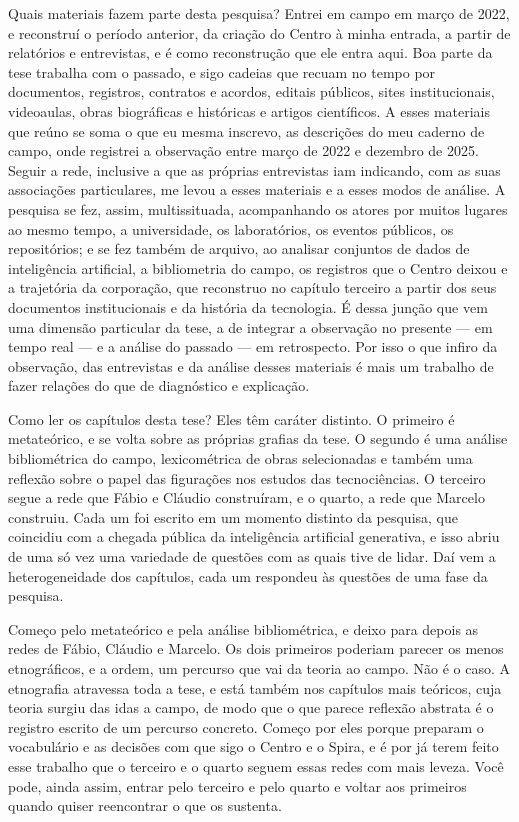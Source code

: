 Quais materiais fazem parte desta pesquisa? Entrei em campo em março de 2022, e reconstruí o período anterior, da criação do Centro à minha entrada, a partir de relatórios e entrevistas, e é como reconstrução que ele entra aqui. Boa parte da tese trabalha com o passado, e sigo cadeias que recuam no tempo por documentos, registros, contratos e acordos, editais públicos, sites institucionais, videoaulas, obras biográficas e históricas e artigos científicos. A esses materiais que reúno se soma o que eu mesma inscrevo, as descrições do meu caderno de campo, onde registrei a observação entre março de 2022 e dezembro de 2025. Seguir a rede, inclusive a que as próprias entrevistas iam indicando, com as suas associações particulares, me levou a esses materiais e a esses modos de análise. A pesquisa se fez, assim, multissituada, acompanhando os atores por muitos lugares ao mesmo tempo, a universidade, os laboratórios, os eventos públicos, os repositórios; e se fez também de arquivo, ao analisar conjuntos de dados de inteligência artificial, a bibliometria do campo, os registros que o Centro deixou e a trajetória da corporação, que reconstruo no capítulo terceiro a partir dos seus documentos institucionais e da história da tecnologia. É dessa junção que vem uma dimensão particular da tese, a de integrar a observação no presente --- em tempo real --- e a análise do passado --- em retrospecto. Por isso o que infiro da observação, das entrevistas e da análise desses materiais é mais um trabalho de fazer relações do que de diagnóstico e explicação.

Como ler os capítulos desta tese? Eles têm caráter distinto. O primeiro é metateórico, e se volta sobre as próprias grafias da tese. O segundo é uma análise bibliométrica do campo, lexicométrica de obras selecionadas e também uma reflexão sobre o papel das figurações nos estudos das tecnociências. O terceiro segue a rede que Fábio e Cláudio construíram, e o quarto, a rede que Marcelo construiu. Cada um foi escrito em um momento distinto da pesquisa, que coincidiu com a chegada pública da inteligência artificial generativa, e isso abriu de uma só vez uma variedade de questões com as quais tive de lidar. Daí vem a heterogeneidade dos capítulos, cada um respondeu às questões de uma fase da pesquisa.

Começo pelo metateórico e pela análise bibliométrica, e deixo para depois as redes de Fábio, Cláudio e Marcelo. Os dois primeiros poderiam parecer os menos etnográficos, e a ordem, um percurso que vai da teoria ao campo. Não é o caso. A etnografia atravessa toda a tese, e está também nos capítulos mais teóricos, cuja teoria surgiu das idas a campo, de modo que o que parece reflexão abstrata é o registro escrito de um percurso concreto. Começo por eles porque preparam o vocabulário e as decisões com que sigo o Centro e o Spira, e é por já terem feito esse trabalho que o terceiro e o quarto seguem essas redes com mais leveza. Você pode, ainda assim, entrar pelo terceiro e pelo quarto e voltar aos primeiros quando quiser reencontrar o que os sustenta.

